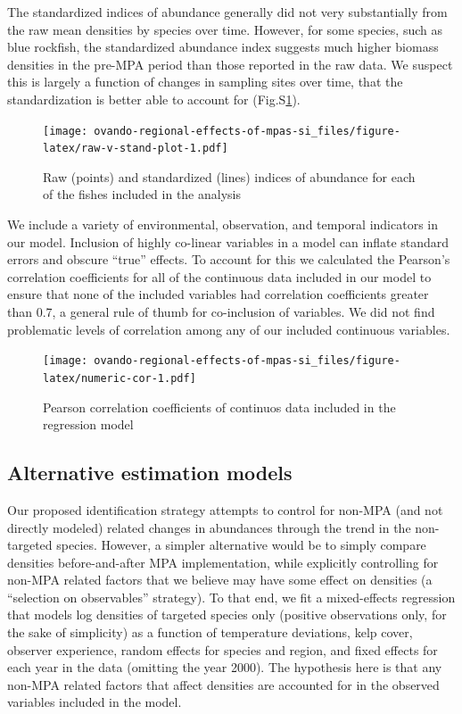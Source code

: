 \documentclass[]{article}
\begin{document}
The standardized indices of abundance generally did not very substantially from the raw mean densities by species over time. However, for some species, such as blue rockfish, the standardized abundance index suggests much higher biomass densities in the pre-MPA period than those reported in the raw data. We suspect this is largely a function of changes in sampling sites over time, that the standardization is better able to account for (Fig.S\ref{fig:raw-v-stand-plot}).

\begin{figure}
\centering
\texttt{[image: ovando-regional-effects-of-mpas-si\_files/figure-latex/raw-v-stand-plot-1.pdf]}
\caption{\label{fig:raw-v-stand-plot}Raw (points) and standardized (lines) indices of abundance for each of the fishes included in the analysis}
\end{figure}

We include a variety of environmental, observation, and temporal indicators in our model. Inclusion of highly co-linear variables in a model can inflate standard errors and obscure ``true'' effects. To account for this we calculated the Pearson's correlation coefficients for all of the continuous data included in our model to ensure that none of the included variables had correlation coefficients greater than 0.7, a general rule of thumb for co-inclusion of variables. We did not find problematic levels of correlation among any of our included continuous variables.

\begin{figure}
\centering
\texttt{[image: ovando-regional-effects-of-mpas-si\_files/figure-latex/numeric-cor-1.pdf]}
\caption{\label{fig:numeric-cor}Pearson correlation coefficients of continuos data included in the regression model}
\end{figure}

\hypertarget{alternative-estimation-models}{%
\subsection{Alternative estimation models}\label{alternative-estimation-models}}

Our proposed identification strategy attempts to control for non-MPA (and not directly modeled) related changes in abundances through the trend in the non-targeted species. However, a simpler alternative would be to simply compare densities before-and-after MPA implementation, while explicitly controlling for non-MPA related factors that we believe may have some effect on densities (a ``selection on observables'' strategy). To that end, we fit a mixed-effects regression that models log densities of targeted species only (positive observations only, for the sake of simplicity) as a function of temperature deviations, kelp cover, observer experience, random effects for species and region, and fixed effects for each year in the data (omitting the year 2000). The hypothesis here is that any non-MPA related factors that affect densities are accounted for in the observed variables included in the model.
\end{document}

